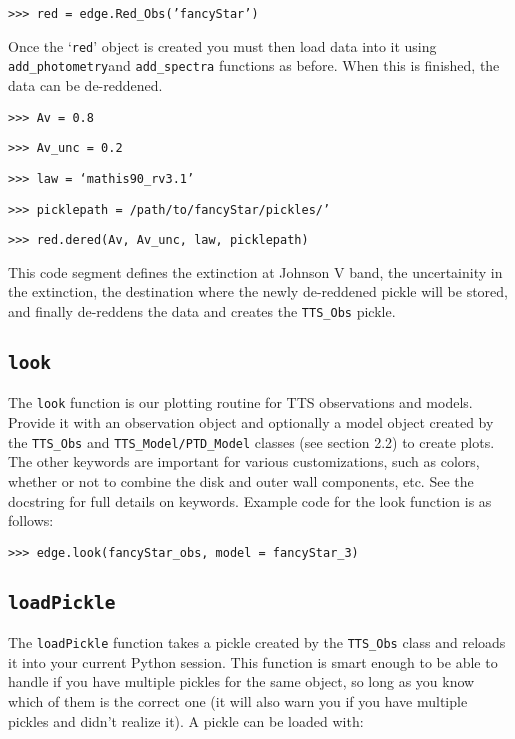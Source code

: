 \documentclass{article}
\begin{document}
\vspace{2mm}
\texttt{>>> red =  edge.Red\_Obs('fancyStar')}
\vspace{2mm}

Once the `\texttt{red}' object is created you must then load data into it using \texttt{add\_photometry}and \texttt{add\_spectra} functions as before. When this is finished, the data can be de-reddened.

\vspace{2mm}
\texttt{>>> Av = 0.8}

\texttt{>>> Av\_unc = 0.2}

\texttt{>>> law = `mathis90\_rv3.1'}

\texttt{>>> picklepath = /path/to/fancyStar/pickles/'}

\texttt{>>> red.dered(Av, Av\_unc, law, picklepath)}
\vspace{2mm}

\noindent This code segment defines the extinction at Johnson V band, the uncertainity in the extinction, the destination where the newly de-reddened pickle will be stored, and finally de-reddens the data and creates the \texttt{TTS\_Obs} pickle. 
 
\subsection{\texttt{look}}
 
The \texttt{look} function is our plotting routine for TTS observations and models. Provide it with an observation object and optionally a model object created by the \texttt{TTS\_Obs} and \texttt{TTS\_Model}\texttt{/PTD\_Model} classes (see section 2.2) to create plots. The other keywords are important for various customizations, such as colors, whether or not to combine the disk and outer wall components, etc. See the docstring for full details on keywords. Example code for the look function is as follows:

\vspace{2mm}
\texttt{>>> edge.look(fancyStar\_obs, model = fancyStar\_3)}
\vspace{2mm}

\subsection{\texttt{loadPickle}}

The \texttt{loadPickle} function takes a pickle created by the \texttt{TTS\_Obs} class and reloads it into your current Python session. This function is smart enough to be able to handle if you have multiple pickles for the same object, so long as you know which of them is the correct one (it will also warn you if you have multiple pickles and didn’t realize it). A pickle can be loaded with:
\end{document}
